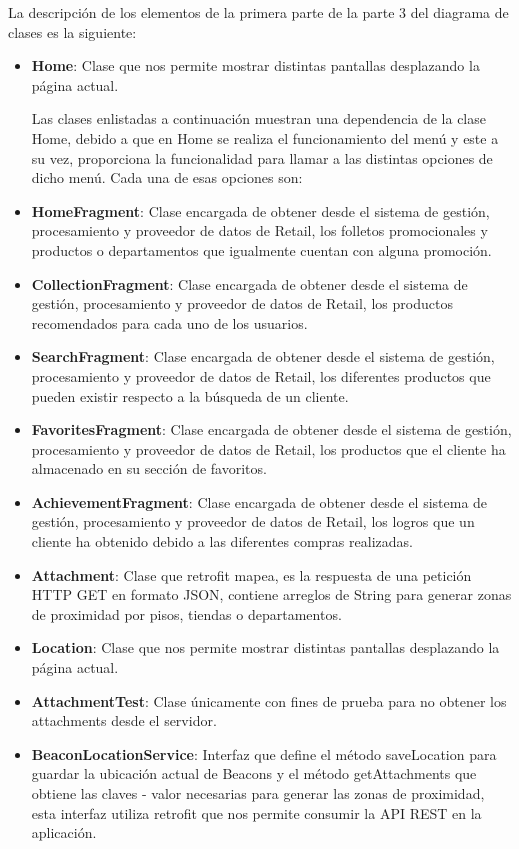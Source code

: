 La descripción de los elementos de la primera parte de la parte 3 del diagrama de clases es la siguiente: 
\begin{itemize}
\item \textbf{Home}: Clase que nos permite mostrar distintas pantallas desplazando la página actual.
\\ \par
Las clases enlistadas a continuación muestran una dependencia de la clase Home, debido a que en Home se realiza el funcionamiento del menú y este a su vez, proporciona la funcionalidad para llamar a las distintas opciones de dicho menú. Cada una de esas opciones son:
\item \textbf{HomeFragment}: Clase encargada de obtener desde el sistema de gestión, procesamiento y proveedor de datos de Retail, los folletos promocionales y productos o departamentos que igualmente cuentan con alguna promoción.
\item \textbf{CollectionFragment}: Clase encargada de obtener desde el sistema de gestión, procesamiento y proveedor de datos de Retail, los productos recomendados para cada uno de los usuarios.
\item \textbf{SearchFragment}: Clase encargada de obtener desde el sistema de gestión, procesamiento y proveedor de datos de Retail, los diferentes productos que pueden existir respecto a la búsqueda de un cliente. 
\item \textbf{FavoritesFragment}: Clase encargada de obtener desde el sistema de gestión, procesamiento y proveedor de datos de Retail, los productos que el cliente ha almacenado en su sección de favoritos.
\item \textbf{AchievementFragment}: Clase encargada de obtener desde el sistema de gestión, procesamiento y proveedor de datos de Retail, los logros que un cliente ha obtenido debido a las diferentes compras realizadas.
\\ \par 
\item \textbf{Attachment}: Clase que retrofit mapea, es la respuesta de una petición HTTP GET en formato JSON, contiene arreglos de String para generar zonas de proximidad por pisos, tiendas o departamentos.
\item \textbf{Location}: Clase que nos permite mostrar distintas pantallas desplazando la página actual.
\item \textbf{AttachmentTest}: Clase únicamente con fines de prueba para no obtener los attachments desde el servidor.
\item \textbf{BeaconLocationService}: Interfaz que define el método saveLocation para guardar la ubicación actual de Beacons y el método getAttachments que obtiene las claves - valor necesarias para generar las zonas de proximidad, esta interfaz utiliza retrofit que nos permite consumir la API REST en la aplicación.
\end{itemize}

